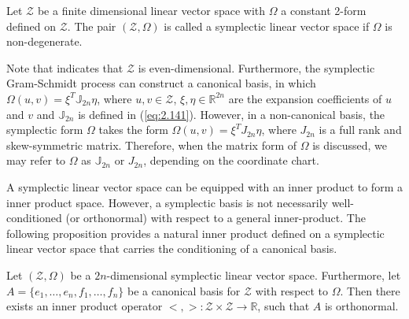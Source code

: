 \begin{definition}
Let $\mathcal Z$ be a finite dimensional linear vector space with $\Omega$ a constant 2-form defined on $\mathcal Z$. The pair $(\mathcal Z,\Omega)$ is called a symplectic linear vector space if $\Omega$ is non-degenerate.
\end{definition}
Note that  indicates that $\mathcal Z$ is even-dimensional. Furthermore, the symplectic Gram-Schmidt process can construct a canonical basis, in which $\Omega(u,v) = \xi^T \mathbb J_{2n} \eta$, where $u,v\in \mathcal Z$, $\xi,\eta \in \mathbb R^{2n}$ are the expansion coefficients of $u$ and $v$ and $\mathbb J_{2n}$ is defined in (\ref{eq:2.141}). However, in a non-canonical basis, the symplectic form $\Omega$ takes the form $\Omega(u,v) = \xi^TJ_{2n}\eta$, where $J_{2n}$ is a full rank and skew-symmetric matrix. Therefore, when the matrix form of $\Omega$ is discussed, we may refer to $\Omega$ as $\mathbb J_{2n}$ or $J_{2n}$, depending on the coordinate chart.

A symplectic linear vector space can be equipped with an inner product to form a inner product space. However, a symplectic basis is not necessarily well-conditioned (or orthonormal) with respect to a general inner-product. The following proposition provides a natural inner product defined on a symplectic linear vector space that carries the conditioning of a canonical basis.

\begin{proposition} \label{theorem:2.11}
Let $(\mathcal Z,\Omega)$ be a $2n$-dimensional symplectic linear vector space. Furthermore, let $A = \{ e_1,\dots,e_n,f_1,\dots,f_n \}$ be a canonical basis for $\mathcal Z$ with respect to $\Omega$. Then there exists an inner product operator $<,>:\mathcal Z\times \mathcal Z \to \mathbb R$, such that $A$ is orthonormal.
\end{proposition}

